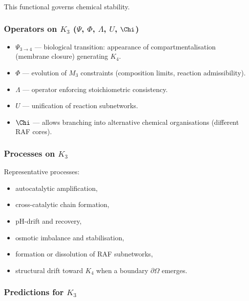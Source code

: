 This functional governs chemical stability.

\subsubsection{Operators on \texorpdfstring{$K_3$}{K_3} (\texorpdfstring{$\Psi$}{\Psi}, \texorpdfstring{$\Phi$}{\Phi}, \texorpdfstring{$\Lambda$}{\Lambda}, \texorpdfstring{$U$}{U}, \texorpdfstring{$\Chi$}{\Chi})}

\begin{itemize}
    \item $\Psi_{3\to4}$ — biological transition: appearance of
          compartmentalisation (membrane closure) generating $K_4$.
    \item $\Phi$ — evolution of $M_3$ constraints (composition limits,
          reaction admissibility).
    \item $\Lambda$ — operator enforcing stoichiometric consistency.
    \item $U$ — unification of reaction subnetworks.
    \item $\Chi$ — allows branching into alternative chemical
          organisations (different RAF cores).
\end{itemize}

\subsubsection{Processes on \texorpdfstring{$K_3$}{K_3}}

Representative processes:
\begin{itemize}
    \item autocatalytic amplification,
    \item cross-catalytic chain formation,
    \item pH-drift and recovery,
    \item osmotic imbalance and stabilisation,
    \item formation or dissolution of RAF subnetworks,
    \item structural drift toward $K_4$ when a boundary $\partial\Omega$
          emerges.
\end{itemize}

\subsubsection{Predictions for \texorpdfstring{$K_3$}{K_3}}

